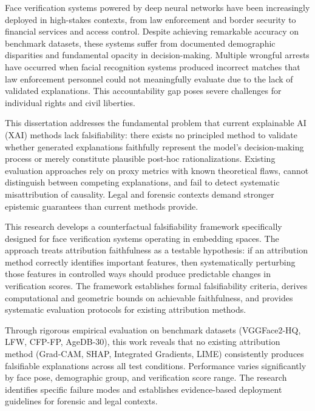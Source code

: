 
Face verification systems powered by deep neural networks have been increasingly deployed in high-stakes contexts, from law enforcement and border security to financial services and access control. Despite achieving remarkable accuracy on benchmark datasets, these systems suffer from documented demographic disparities and fundamental opacity in decision-making. Multiple wrongful arrests have occurred when facial recognition systems produced incorrect matches that law enforcement personnel could not meaningfully evaluate due to the lack of validated explanations. This accountability gap poses severe challenges for individual rights and civil liberties.

This dissertation addresses the fundamental problem that current explainable AI (XAI) methods lack falsifiability: there exists no principled method to validate whether generated explanations faithfully represent the model's decision-making process or merely constitute plausible post-hoc rationalizations. Existing evaluation approaches rely on proxy metrics with known theoretical flaws, cannot distinguish between competing explanations, and fail to detect systematic misattribution of causality. Legal and forensic contexts demand stronger epistemic guarantees than current methods provide.

This research develops a counterfactual falsifiability framework specifically designed for face verification systems operating in embedding spaces. The approach treats attribution faithfulness as a testable hypothesis: if an attribution method correctly identifies important features, then systematically perturbing those features in controlled ways should produce predictable changes in verification scores. The framework establishes formal falsifiability criteria, derives computational and geometric bounds on achievable faithfulness, and provides systematic evaluation protocols for existing attribution methods.

Through rigorous empirical evaluation on benchmark datasets (VGGFace2-HQ, LFW, CFP-FP, AgeDB-30), this work reveals that no existing attribution method (Grad-CAM, SHAP, Integrated Gradients, LIME) consistently produces falsifiable explanations across all test conditions. Performance varies significantly by face pose, demographic group, and verification score range. The research identifies specific failure modes and establishes evidence-based deployment guidelines for forensic and legal contexts.

